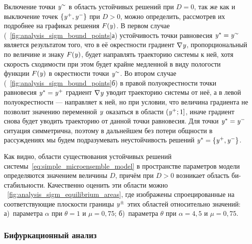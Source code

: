 Включение точки $\mathit{y}^{\sim}$ в область устойчивых решений при $D = 0$, так же как и выключение точек $\left\{\mathit{y}^{+}, \mathit{y}^{-}\right\}$ при $D > 0$, можно определить, рассмотрев их подробнее на графиках решения $F(\mathit{y})$. В первом случае (\seefigure~\ref{fig:analysis_sigm_bound_points}а) устойчивость точки равновесия $\mathit{y}^{*} = \mathit{y}^{\sim}$ является результатом того, что в её окрестности градиент $\nabla\mathit{y}$, пропорциональный по величине и знаку $F(\mathit{y})$, будет направлять траекторию системы к ней, хотя скорость сходимости при этом будет крайне медленной в виду пологости функции $F(\mathit{y})$ в окрестности точки $\mathit{y}^{\sim}$. Во втором случае (\seefigure~\ref{fig:analysis_sigm_bound_points}б) в правой полуокрестности точки равновесия $\mathit{y}^{*} = \mathit{y}^{+}$ градиент $\nabla\mathit{y}$ уводит траекторию системы от неё, а в левой полуокрестности --- направляет к ней, но при условии, что величина градиента не позволит значению переменной $\mathit{y}$ оказаться в области $\left(\mathit{y}^{+}; 1\right]$, иначе градиент снова будет уводить траекторию от данной точки равновесия. Для точки $\mathit{y}^{*} = \mathit{y}^{-}$ ситуация симметрична, поэтому в дальнейшем без потери общности в рассуждениях мы будем подразумевать неустойчивость решений $\mathit{y}^{*} = \left\{\mathit{y}^{+}, \mathit{y}^{-}\right\}$.

Как видно, области существования устойчивых решений системы~\eqref{eq:simple_microensemble_model} в пространстве параметров модели определяются значением величины $D$, причём при $D > 0$ возникает область би-стабильности. Качественно оценить эти области можно \onfigure~\ref{fig:analysis_sigm_equilibrium_areas}, где изображены спроецированные на соответствующие плоскости границы $\mathit{y}^{\pm}$ этих областей относительно значений: а)~параметра $\alpha$ при $\theta = 1$ и $\mu = 0,75$; б)~параметра $\theta$ при $\alpha = 4,5$ и $\mu = 0,75$.

\subsubsection{Бифуркационный анализ}

